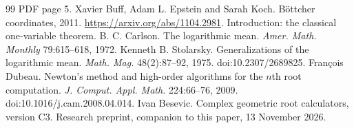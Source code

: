 \begin{thebibliography}{99}
PDF page 5.
 Xavier Buff, Adam L. Epstein and Sarah Koch. B\"ottcher coordinates, 2011.
\url{https://arxiv.org/abs/1104.2981}. Introduction: the classical one-variable theorem.
 B. C. Carlson. The logarithmic mean. \emph{Amer. Math. Monthly} 79:615--618, 1972.
 Kenneth B. Stolarsky. Generalizations of the logarithmic mean. \emph{Math. Mag.}
48(2):87--92, 1975. doi:10.2307/2689825.
 Fran\c{c}ois Dubeau. Newton's method and high-order algorithms for the $n$th root
computation. \emph{J. Comput. Appl. Math.} 224:66--76, 2009. doi:10.1016/j.cam.2008.04.014.
 Ivan Besevic. Complex geometric root calculators, version C3. Research preprint,
companion to this paper, 13 November 2026.
\end{thebibliography}
